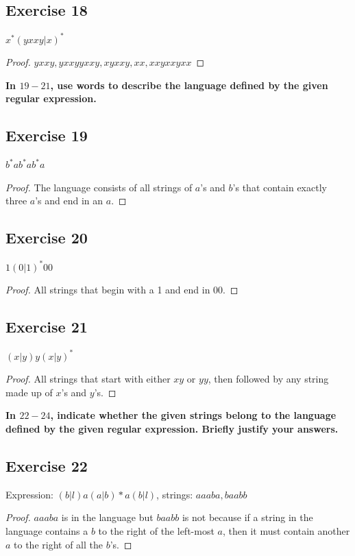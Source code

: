 \documentclass[14pt]{extarticle}
\newcommand{\cy}{\color{cyan}}
\begin{document}
\subsection{Exercise 18}
\(x^*(yxxy | x)^*\)

\begin{proof}
\(yxxy, yxxyyxxy, xyxxy, xx, xxyxxyxx\)
\end{proof}

{\bf In \(19-21\), use words to describe the language defined by the given regular expression.}

\subsection{Exercise 19}
\(b^*ab^*ab^*a\)

\begin{proof}
The language consists of all strings of \(a\)’s and \(b\)’s that contain exactly three \(a\)’s and end in an \(a\).
\end{proof}

\subsection{Exercise 20}
\(1(0 | 1)^* 00\)

\begin{proof}
All strings that begin with a 1 and end in 00.
\end{proof}

\subsection{Exercise 21}
\((x | y)y(x | y)^*\)

\begin{proof}
All strings that start with either \(xy\) or \(yy\), then followed by any string made up of \(x\)'s and \(y\)'s.
\end{proof}

{\bf \cy In \(22-24\), indicate whether the given strings belong to the language defined by the given regular 
expression. Briefly justify your answers.}

\subsection{Exercise 22}
Expression: \((b | l)a(a | b)* a(b | l)\), strings: \(aaaba, baabb\)

\begin{proof}
\(aaaba\) is in the language but \(baabb\) is not because if a string in the language contains a \(b\) to the right of the 
left-most \(a\), then it must contain another \(a\) to the right of all the \(b\)’s.
\end{proof}
\end{document}
